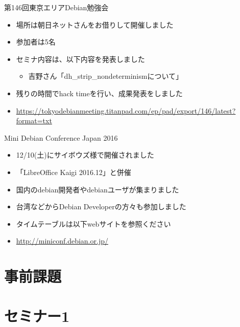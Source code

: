 \begin{frame}{第146回東京エリアDebian勉強会}

\begin{itemize}
\item 場所は朝日ネットさんをお借りして開催しました
\item 参加者は5名
\item セミナ内容は、以下内容を発表しました
  \begin{itemize}
  \item 吉野さん「dh\_strip\_nondeterminismについて」
  \end{itemize}
\item 残りの時間でhack timeを行い、成果発表をしました
\item \url{https://tokyodebianmeeting.titanpad.com/ep/pad/export/146/latest?format=txt}
\end{itemize} 
\end{frame}

\begin{frame}{Mini Debian Conference Japan 2016}

\begin{itemize}
\item 12/10(土)にサイボウズ様で開催されました
\item 「LibreOffice Kaigi 2016.12」と併催
\item 国内のdebian開発者やdebianユーザが集まりました
\item 台湾などからDebian Developerの方々も参加しました
\item タイムテーブルは以下webサイトを参照ください
\item \url{http://miniconf.debian.or.jp/}
\end{itemize} 
\end{frame}

\section{事前課題}
{\footnotesize
 
}

%
%

\section{セミナー1}

